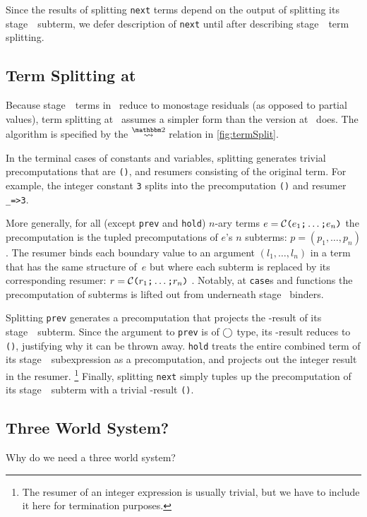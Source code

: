 \begin{abstrsyn}
Since the results of splitting \texttt{next} terms depend on the output of splitting its stage~\bbtwo\ subterm,
we defer description of \texttt{next} until after describing stage~\bbtwo\ term splitting.

\subsection{Term Splitting at \bbtwo}

Because stage~\bbtwo\ terms in \lang\ reduce to monostage residuals (as opposed to partial values),
term splitting at \bbtwo\ assumes a simpler form than the version at \bbonem\ does. 
The algorithm is specified by the $\splittwosym$ relation in \cref{fig:termSplit}.

In the terminal cases of
constants and variables, splitting generates trivial precomputations that are \texttt{()}, and resumers consisting of the original term.
For example, the integer constant \texttt{3} splits into the
precomputation \texttt{()} and resumer \texttt{\_=>3}.

More generally, for all (except \texttt{prev} and \texttt{hold}) 
$n$-ary terms $e = \mathcal{C}\texttt{(} e_1 \texttt{;} \ldots \texttt{;} e_n \texttt{)}$ 
the precomputation is the tupled precomputations of $e$'s $n$ subterms:
$p=(p_1,\ldots,p_n)$.  The resumer binds each boundary value to an
argument $(l_1,\ldots,l_n)$ in a term that has the same structure
of~$e$ but where each subterm is replaced by its corresponding resumer:
$r = \mathcal{C}\texttt{(} r_1 \texttt{;} \ldots \texttt{;} r_n \texttt{)}$ .
Notably, at \texttt{case}s and functions the
precomputation of subterms is lifted out from underneath stage \bbtwo\ binders.  

Splitting \texttt{prev} generates a precomputation that projects the \bbone-result of its stage~\bbone\ subterm.
Since the argument to \texttt{prev} is of $\bigcirc$ type, its \bbone-result reduces to \texttt{()}, justifying why it can be thrown away.
\texttt{hold} treats the entire combined term of its stage~\bbone\ subexpression as a precomputation, 
and projects out the integer result in the resumer. 
\footnote{The resumer of an integer expression is usually trivial, 
but we have to include it here for termination purposes.} 
Finally, splitting \texttt{next} simply tuples up the precomputation of its stage~\bbtwo\ subterm with a trivial \bbone-result \texttt{()}.

\subsection {Three World System?}

Why do we need a three world system?

\end{abstrsyn}



